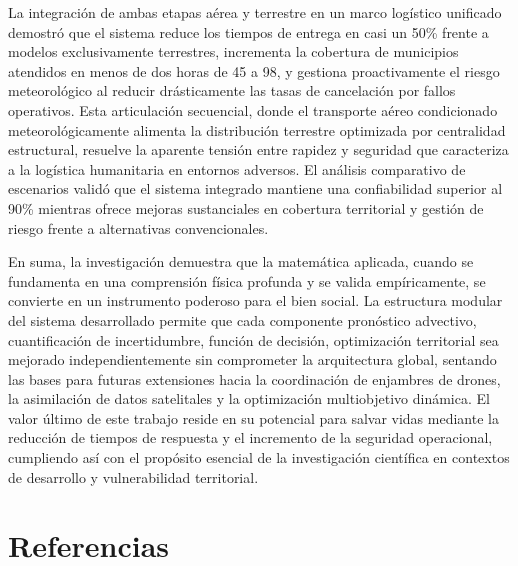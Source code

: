 \documentclass[
  spanish,
  us-letterpaper,
]{scrreprt}
\numberwithin{equation}{section}
\begin{document}
La integración de ambas etapas aérea y terrestre en un marco logístico
unificado demostró que el sistema reduce los tiempos de entrega en casi
un 50\% frente a modelos exclusivamente terrestres, incrementa la
cobertura de municipios atendidos en menos de dos horas de 45 a 98, y
gestiona proactivamente el riesgo meteorológico al reducir drásticamente
las tasas de cancelación por fallos operativos. Esta articulación
secuencial, donde el transporte aéreo condicionado meteorológicamente
alimenta la distribución terrestre optimizada por centralidad
estructural, resuelve la aparente tensión entre rapidez y seguridad que
caracteriza a la logística humanitaria en entornos adversos. El análisis
comparativo de escenarios validó que el sistema integrado mantiene una
confiabilidad superior al 90\% mientras ofrece mejoras sustanciales en
cobertura territorial y gestión de riesgo frente a alternativas
convencionales.

En suma, la investigación demuestra que la matemática aplicada, cuando
se fundamenta en una comprensión física profunda y se valida
empíricamente, se convierte en un instrumento poderoso para el bien
social. La estructura modular del sistema desarrollado permite que cada
componente pronóstico advectivo, cuantificación de incertidumbre,
función de decisión, optimización territorial sea mejorado
independientemente sin comprometer la arquitectura global, sentando las
bases para futuras extensiones hacia la coordinación de enjambres de
drones, la asimilación de datos satelitales y la optimización
multiobjetivo dinámica. El valor último de este trabajo reside en su
potencial para salvar vidas mediante la reducción de tiempos de
respuesta y el incremento de la seguridad operacional, cumpliendo así
con el propósito esencial de la investigación científica en contextos de
desarrollo y vulnerabilidad territorial.


\chapter*{Referencias}\label{referencias}

\end{document}
